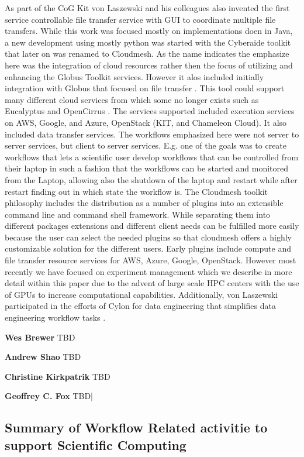 \documentclass[utf8]{FrontiersinVancouver} %
\begin{document}
As part of the CoG Kit von Laszewski and his colleagues also invented the first service controllable file transfer service with GUI to coordinate multiple file transfers. While this work was focused mostly on implementations doen in Java, a new development using mostly python was started with the Cyberaide toolkit \citep{las-09-ccgrid} that later on was renamed to Cloudmesh. As the name indicates the emphasize here was the integration of cloud resources rather then the focus of utilizing and enhancing the Globus Toolkit services. However it alos included initially integration with Globus that focused on file transfer 
\citep{las-04-ftp-journal}
\citep{las-03-ftp}.
This tool could support many different cloud services from which some no longer exists such as Eucalyptus \cite{eucalyptus} and OpenCirrus \cite{opencirrus}. The services supported included execution services on AWS, Google, and Azure, OpenStack (KIT, and Chameleon Cloud). It also included data transfer services. The workflows emphasized here were not server to server services, but client to server services. E.g. one of the goals was to create workflows that lets a scientific user develop workflows that can be controlled from their laptop in such a fashion that the workflows can be started and monitored from the Laptop, allowing also the shutdown of the laptop and restart while after restart finding out in which state the workflow is. 
The Cloudmesh toolkit philosophy includes the distribution as a number of plugins into an extensible command line and command shell framework. While separating them into different packages extensions and different client needs can be fulfilled more easily because the user can select the needed plugins so that cloudmesh offers a highly customizable solution for the different users. Early plugins include compute and file transfer resource services for AWS, Azure, Google, OpenStack. However  most recently we have focused on experiment management which we describe in more detail within this paper due to the advent of large scale HPC centers with the use of GPUs to increase computational capabilities. 
Additionally, von Laszewski participated in the efforts of Cylon for data engineering that simplifies data engineering workflow tasks \citep{cylon,cylon-radical}. 

{\bf Wes Brewer} TBD

{\bf Andrew Shao} TBD

{\bf Christine Kirkpatrik} TBD

{\bf Geoffrey C. Fox} TBD|

\subsection{Summary of Workflow Related activitie to support Scientific Computing}
\end{document}
